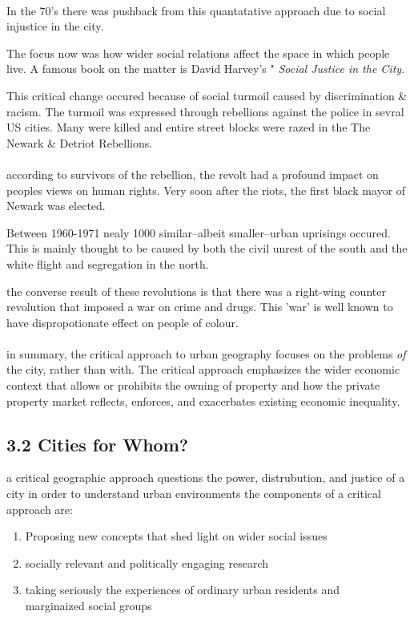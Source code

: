 \documentclass[12pt]{book}
\begin{document}
\paragraph{}
In the 70's there was pushback from this quantatative approach due to social injustice in the city.

The focus now was how wider social relations affect the space in which people live.
A famous book on the matter is David Harvey's " \textit{Social Justice in the City}.

This critical change occured because of social turmoil caused by discrimination \& racism. 
The turmoil was expressed through rebellions against the police in sevral US cities. 
Many were killed and entire street blocks were razed in the The Newark \& Detriot Rebellions.

\paragraph{}
according to survivors of the rebellion, the revolt had a profound impact on peoples views on human rights.
Very soon after the riots, the first black mayor of Newark was elected.

Between 1960-1971 nealy 1000 similar--albeit smaller--urban uprisings occured. 
This is mainly thought to be caused by both the civil unrest of the south and the white flight and segregation in the north.

the converse result of these revolutions is that there was a right-wing counter revolution that imposed a war on crime and drugs.
This 'war' is well known to have dispropotionate effect on people of colour.

\paragraph{}
in summary, the critical approach to urban geography focuses on the problems \textit{of} the city, rather than with.
The critical approach emphasizes the wider economic context that allows or prohibits the owning of property
        and how the private property market reflects, enforces, and exacerbates existing economic inequality.


\subsection*{3.2 Cities for Whom?}
a critical geographic approach questions the power, distrubution, and justice of a city in order to understand urban environments
the components of a critical approach are:
\begin{enumerate}
        \item Proposing new concepts that shed light on wider social issues
        \item socially relevant and politically engaging research
        \item taking seriously the experiences of ordinary urban residents and\\
                marginaized social groups
\end{enumerate}
\end{document}
